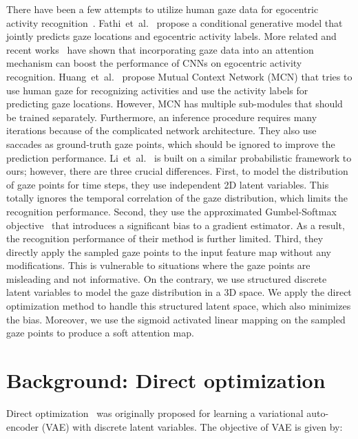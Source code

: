 \documentclass[10pt,twocolumn,letterpaper]{article}
\begin{document}
There have been a few attempts to utilize human gaze data for egocentric activity recognition~\cite{fathi2012learning,huang2019mutual,li2018eye}. Fathi~et~al.~\cite{fathi2012learning} propose a conditional generative model that jointly predicts gaze locations and egocentric activity labels. More related and recent works~\cite{huang2019mutual,li2018eye} have shown that incorporating gaze data into an attention mechanism can boost the performance of CNNs on egocentric activity recognition. Huang~et~al.~\cite{huang2019mutual} propose Mutual Context Network (MCN) that tries to use human gaze for recognizing activities and use the activity labels for predicting gaze locations. However, MCN has multiple sub-modules that should be trained separately. Furthermore, an inference procedure requires many iterations because of the complicated network architecture. They also use saccades as ground-truth gaze points, which should be ignored to improve the prediction performance. Li~et~al.~\cite{li2018eye} is built on a similar probabilistic framework to ours; however, there are three crucial differences. First, to model the distribution of gaze points for  time steps, they use  independent 2D latent variables. This totally ignores the temporal correlation of the gaze distribution, which limits the recognition performance. Second, they use the approximated Gumbel-Softmax objective~\cite{jang2016categorical,maddison2016concrete} that introduces a significant bias to a gradient estimator. As a result, the recognition performance of their method is further limited. Third, they directly apply the sampled gaze points  to the input feature map without any modifications. This is vulnerable to situations where the gaze points are misleading and not informative. On the contrary, we use structured discrete latent variables to model the gaze distribution in a 3D space. We apply the direct optimization method to handle this structured latent space, which also minimizes the bias. Moreover, we use the sigmoid activated linear mapping on the sampled gaze points to produce a soft attention map.

\section{Background: Direct optimization} \label{sec:background}
Direct optimization~\cite{lorberbom2018direct} was originally proposed for learning a variational auto-encoder (VAE) with discrete latent variables. The objective of VAE is given by:
\end{document}
